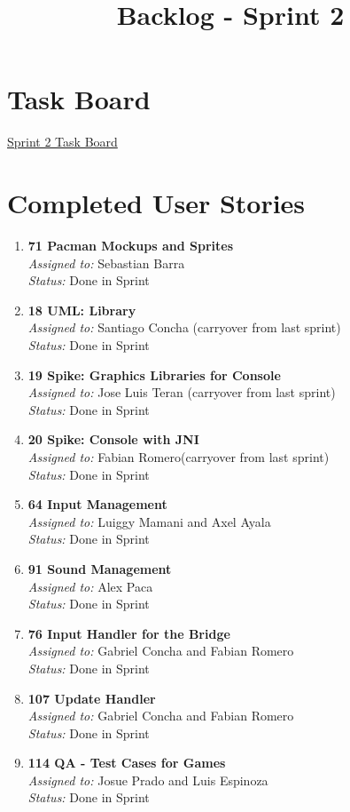 \documentclass{article}
\begin{document}
\title{Backlog - Sprint 2}
\author{}
\date{}
\maketitle

\section*{Task Board}
\href{https://tree.taiga.io/project/joseluis-teran-coffeetime/taskboard/sprint-2-12274}{Sprint 2 Task Board}

\section*{Completed User Stories}

\begin{enumerate}
    \item \textbf{71 Pacman Mockups and Sprites} \\
    \textit{Assigned to:} Sebastian Barra \\
    \textit{Status:} Done in Sprint
    \item \textbf{18 UML: Library} \\
    \textit{Assigned to:} Santiago Concha (carryover from last sprint) \\
    \textit{Status:} Done in Sprint
    \item \textbf{19 Spike: Graphics Libraries for Console} \\
    \textit{Assigned to:} Jose Luis Teran (carryover from last sprint)\\
    \textit{Status:} Done in Sprint
    \item \textbf{20 Spike: Console with JNI} \\
    \textit{Assigned to:} Fabian Romero(carryover from last sprint)\\
    \textit{Status:} Done in Sprint
    \item \textbf{64 Input Management} \\
    \textit{Assigned to:} Luiggy Mamani and Axel Ayala \\
    \textit{Status:} Done in Sprint
    \item \textbf{91 Sound Management} \\
    \textit{Assigned to:} Alex Paca \\
    \textit{Status:} Done in Sprint
    \item \textbf{76 Input Handler for the Bridge} \\
    \textit{Assigned to:} Gabriel Concha and Fabian Romero \\
    \textit{Status:} Done in Sprint
    \item \textbf{107 Update Handler} \\
    \textit{Assigned to:} Gabriel Concha and Fabian Romero \\
    \textit{Status:} Done in Sprint
    \item \textbf{114 QA - Test Cases for Games} \\
    \textit{Assigned to:} Josue Prado and Luis Espinoza \\
    \textit{Status:} Done in Sprint
\end{enumerate}
\end{document}
